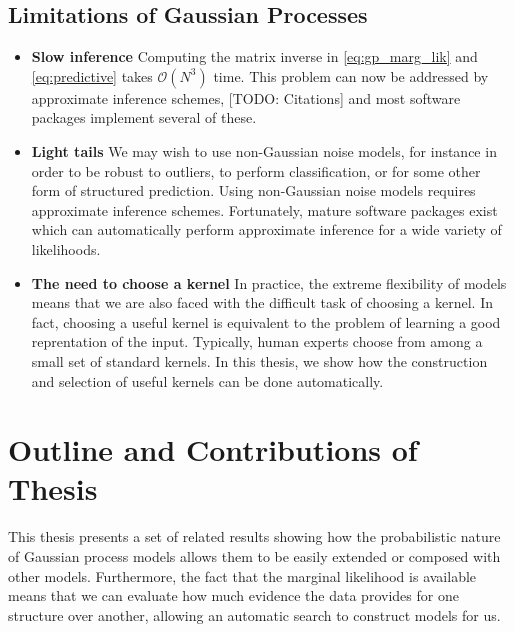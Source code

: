 \subsection{Limitations of Gaussian Processes}

\begin{itemize}

\item {\bf Slow inference}
Computing the matrix inverse in \eqref{eq:gp_marg_lik} and \eqref{eq:predictive} takes $\mathcal{O}(N^3)$ time.
This problem can now be addressed by approximate inference schemes, [TODO: Citations] and most \gp{} software packages implement several of these.

\item {\bf Light tails}
We may wish to use non-Gaussian noise models, for instance in order to be robust to outliers, to perform classification, or for some other form of structured prediction.
Using non-Gaussian noise models requires approximate inference schemes.
Fortunately, mature software packages exist which can automatically perform approximate inference for a wide variety of likelihoods.

\item {\bf The need to choose a kernel}
In practice, the extreme flexibility of \gp{} models means that we are also faced with the difficult task of choosing a kernel.
In fact, 
choosing a useful kernel is equivalent to the problem of learning a good reprentation of the input.
Typically, human experts choose from among a small set of standard kernels.
In this thesis, we show how the construction and selection of useful kernels can be done automatically.
\end{itemize}





\section{Outline and Contributions of Thesis}

This thesis presents a set of related results showing how the probabilistic nature of Gaussian process models allows them to be easily extended or composed with other models.
Furthermore, the fact that the marginal likelihood is available means that we can evaluate how much evidence the data provides for one structure over another, allowing an automatic search to construct models for us.

